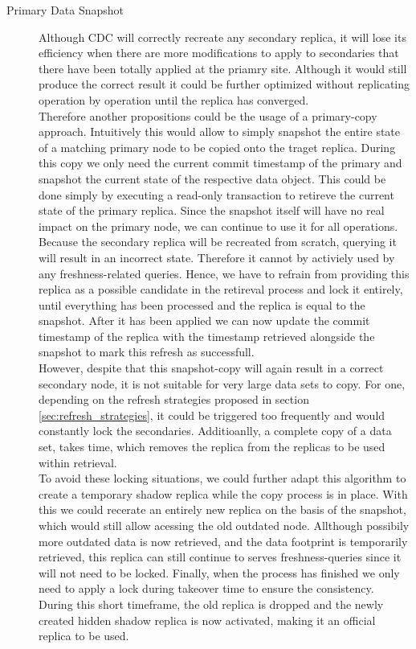 \begin{description}




    \item [Primary Data Snapshot]
    Although CDC will correctly recreate any secondary replica, it will lose its efficiency when there are more modifications to apply to secondaries that there 
    have been totally applied at the priamry site. Although it would still produce the correct result it could be further optimized without replicating operation by operation 
    until the replica has converged.\\
    Therefore another propositions could be the usage of a primary-copy approach. 
    Intuitively this would allow to simply snapshot the entire state of a matching primary node to be copied onto the traget replica.
    During this copy we only need the current commit timestamp of the primary and snapshot the current state of the respective data object. 
    This could be done simply by executing a read-only transaction to retireve the current state of the primary replica.
    Since the snapshot itself will have no real impact on the primary node, we can continue to use it for all operations.
    Because the secondary replica will be recreated from scratch, querying it will result in an incorrect state. 
    Therefore it cannot by activiely used by any freshness-related queries.
    Hence, we have to refrain from providing this replica as a possible candidate in the retireval process and lock it entirely, 
    until everything has been processed and the replica is equal to the snapshot. After it has been applied we can now update the commit timestamp of the replica
    with the timestamp retrieved alongside the snapshot to mark this refresh as successfull.\\
    However, despite that this snapshot-copy will again result in a correct secondary node, it is not suitable for very large data sets to copy.  
    For one, depending on the refresh strategies proposed in section \ref{sec:refresh_strategies}, it could be triggered too frequently and would constantly lock the 
    secondaries. Additioanlly, a complete copy of a data set, takes time, which removes the replica from the replicas to be used within retrieval.\\
    To avoid these locking situations, we could further adapt this algorithm to create a temporary shadow replica while the copy process is in place.
    With this we could recerate an entirely new replica on the basis of the snapshot, which would still allow acessing the old outdated node.
    Allthough possibily more outdated data is now retrieved, and the data footprint is temporarily retrieved, this replica can still continue to serves freshness-queries 
    since it will not need to be locked.
    Finally, when the process has finished we only need to apply a lock during takeover time to ensure the consistency. During this short timeframe, the old replica is dropped
    and the newly created hidden shadow replica is now activated, making it an official replica to be used.



\end{description}
